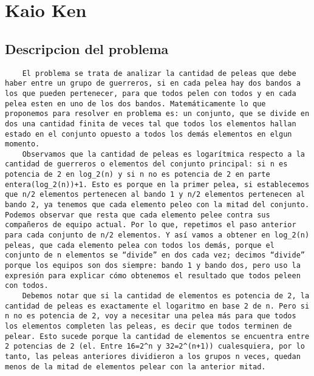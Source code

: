 \documentclass[10pt,a4paper]{article}
\begin{document}

\section{Kaio Ken}

\subsection{Descripcion del problema}

\begin{verbatim}
	El problema se trata de analizar la cantidad de peleas que debe haber entre un grupo de guerreros, si en cada pelea hay dos bandos a los que pueden pertenecer, para que todos pelen con todos y en cada pelea esten en uno de los dos bandos. Matemáticamente lo que proponemos para resolver en problema es: un conjunto, que se divide en dos una cantidad finita de veces tal que todos los elementos hallan estado en el conjunto opuesto a todos los demás elementos en elgun momento.
	Observamos que la cantidad de peleas es logarítmica respecto a la cantidad de guerreros o elementos del conjunto principal: si n es potencia de 2 en log_2(n) y si n no es potencia de 2 en parte entera(log_2(n))+1. Esto es porque en la primer pelea, si establecemos que n/2 elementos pertenecen al bando 1 y n/2 elementos pertenecen al bando 2, ya tenemos que cada elemento peleo con la mitad del conjunto. Podemos observar que resta que cada elemento pelee contra sus compañeros de equipo actual. Por lo que, repetimos el paso anterior para cada conjunto de n/2 elementos. Y así vamos a obtener en log_2(n) peleas, que cada elemento pelea con todos los demás, porque el conjunto de n elementos se “divide” en dos cada vez; decimos “divide” porque los equipos son dos siempre: bando 1 y bando dos, pero uso la expresión para explicar cómo obtenemos el resultado que todos peleen con todos. 
	Debemos notar que si la cantidad de elementos es potencia de 2, la cantidad de peleas es exactamente el logaritmo en base 2 de n. Pero si n no es potencia de 2, voy a necesitar una pelea más para que todos los elementos completen las peleas, es decir que todos terminen de pelear. Esto sucede porque la cantidad de elementos se encuentra entre 2 potencias de 2 (el. Entre 16=2^n y 32=2^(n+1)) cualesquiera, por lo tanto, las peleas anteriores dividieron a los grupos n veces, quedan menos de la mitad de elementos pelear con la anterior mitad. 
\end{verbatim}
\end{document}
